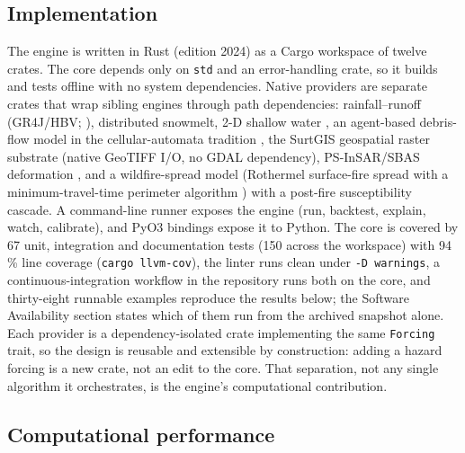 \documentclass[authoryear,preprint,review,12pt]{elsarticle}
\begin{document}
\subsection{Implementation}

The engine is written in Rust (edition 2024) as a Cargo workspace of twelve
crates. The core depends only on \texttt{std} and an error-handling crate, so it builds and tests offline with no system dependencies. Native providers are separate crates that wrap sibling engines through path dependencies:
rainfall--runoff (GR4J/HBV; \citealp{perrin2003,seibert2012}), distributed
snowmelt, 2-D shallow water \citep{audusse2004,toro1994}, an agent-based
debris-flow model in the cellular-automata tradition \citep{dambrosio2003}, the SurtGIS geospatial raster substrate \citep{parra2026surtgis} (native GeoTIFF I/O, no GDAL dependency), PS-InSAR/SBAS deformation \citep{ferretti2001,berardino2002}, and a wildfire-spread model (Rothermel surface-fire spread \citep{andrews2018} with a minimum-travel-time perimeter algorithm \citep{finney1998}) with a post-fire susceptibility cascade. A command-line runner exposes the engine (run, backtest, explain, watch, calibrate), and PyO3 bindings expose it to Python. The core is covered by 67 unit, integration and documentation tests (150 across the workspace) with 94\,\% line coverage (\texttt{cargo llvm-cov}), the linter runs clean under \texttt{-D warnings}, a continuous-integration workflow in the repository runs both on the core, and thirty-eight runnable examples reproduce the results below; the Software
Availability section states which of them run from the archived snapshot alone.
Each provider is a dependency-isolated crate implementing the same \texttt{Forcing}
trait, so the design is reusable and extensible by construction: adding a hazard
forcing is a new crate, not an edit to the core. That separation, not any single
algorithm it orchestrates, is the engine's computational contribution.

\subsection{Computational performance}
\end{document}
